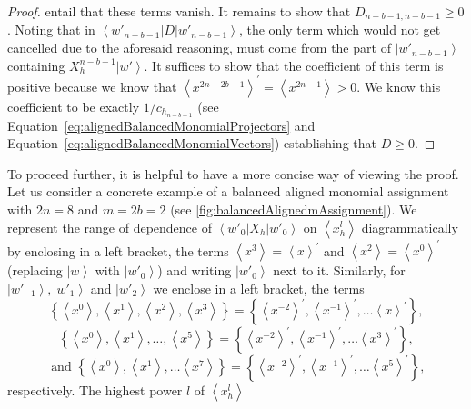 \documentclass{article}
\begin{document}
\begin{proof}
  entail that these terms vanish. It remains to show that $D_{n-b-1,n-b-1}\ge0$.
  Noting that in $\left\langle w'_{n-b-1}\right|D\left|w'_{n-b-1}\right\rangle $,
  the only term which would not get cancelled due to the aforesaid reasoning,
  must come from the part of $\left|w'_{n-b-1}\right\rangle $ containing
  $X_{h}^{n-b-1}\left|w'\right\rangle $. It suffices to show that the
  coefficient of this term is positive because we know that $\left\langle x^{2n-2b-1}\right\rangle ^{\prime}=\left\langle x^{2n-1}\right\rangle >0$.
  We know this coefficient to be exactly $1/c_{h_{n-b-1}}$
  (see Equation~\eqref{eq:alignedBalancedMonomialProjectors} and Equation~\eqref{eq:alignedBalancedMonomialVectors})
  establishing that $D\ge0$.
\end{proof}


To proceed further, it is helpful to have a more concise way of viewing
the proof. Let us consider a concrete example of a balanced
aligned monomial assignment with $2n=8$ and $m=2b=2$ (see  \cref{fig:balancedAlignedmAssignment}).
We represent the range of dependence of $\left\langle w'_{0}\right|X_{h}\left|w'_{0}\right\rangle $
on $\left\langle x_{h}^{l}\right\rangle $ diagrammatically by enclosing
in a left bracket, the terms $\left\langle x^{3}\right\rangle =\left\langle x\right\rangle ^{\prime}$
and $\left\langle x^{2}\right\rangle =\left\langle x^{0}\right\rangle ^{\prime}$
(replacing $\left|w\right\rangle $ with $\left|w'_{0}\right\rangle $)
and writing $\left|w'_{0}\right\rangle $ next to it. Similarly, for
$\left|w'_{-1}\right\rangle ,\left|w'_{1}\right\rangle $ and $\left|w'_{2}\right\rangle $
we enclose in a left bracket, the terms
\begin{displaymath}
  \left\{ \left\langle x^{0}\right\rangle ,\left\langle x^{1}\right\rangle ,\left\langle x^{2}\right\rangle ,\left\langle x^{3}\right\rangle \right\} =\left\{ \left\langle x^{-2}\right\rangle ^{\prime},\left\langle x^{-1}\right\rangle ^{\prime},\dots\left\langle x\right\rangle ^{\prime}\right\} ,\end{displaymath}
\begin{displaymath}\left\{ \left\langle x^{0}\right\rangle ,\left\langle x^{1}\right\rangle ,\dots,\left\langle x^{5}\right\rangle \right\} =\left\{ \left\langle x^{-2}\right\rangle ^{\prime},\left\langle x^{-1}\right\rangle ^{\prime},\dots\left\langle x^{3}\right\rangle ^{\prime}\right\},
\end{displaymath}
\begin{displaymath}\text{ and }
  \left\{ \left\langle x^{0}\right\rangle ,\left\langle x^{1}\right\rangle ,\dots\left\langle x^{7}\right\rangle \right\} =\left\{ \left\langle x^{-2}\right\rangle ^{\prime},\left\langle x^{-1}\right\rangle ^{\prime},\dots\left\langle x^{5}\right\rangle ^{\prime}\right\},
\end{displaymath}respectively. The highest power $l$ of $\left\langle x_{h}^{l}\right\rangle $
\end{document}
